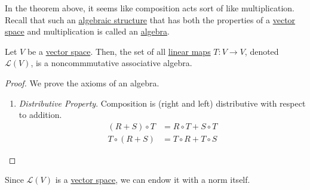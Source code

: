   In the theorem above, it seems like composition acts sort of like multiplication. Recall that such an \hyperref[alg-def:algebraic-structure]{algebraic structure} that has both the properties of a \hyperref[def:vector-space]{vector space} and multiplication is called an \hyperref[alg-def:algebra]{algebra}. 

	\begin{theorem}
	  \label{thm:algebra-of-linear-maps}
	  Let $V$ be a \hyperref[def:vector-space]{vector space}. Then, the set of all \hyperref[def:linear_map]{linear maps} $T: V \to V$, denoted $\mathcal{L}(V)$, is a noncommmutative associative algebra. 
	\end{theorem}
	\begin{proof}
		We prove the axioms of an algebra. 
		\begin{enumerate}
		  \item \textit{Distributive Property}. Composition is (right and left) distributive with respect to addition. 
			\begin{align}
				(R + S) \circ T & =  R \circ T + S \circ T \\
				T \circ (R + S) & =  T \circ R + T \circ S 
			\end{align}
		\end{enumerate}
	\end{proof}

	Since $\mathcal{L}(V)$ is a \hyperref[def:vector-space]{vector space}, we can endow it with a norm itself. 

